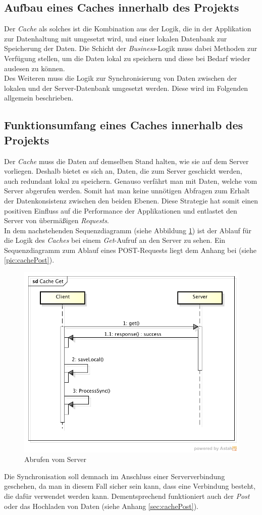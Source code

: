 \subsection{Aufbau eines Caches innerhalb des Projekts}
\label{ssec:cache-aufbau}
Der \textit{Cache} als solches ist die Kombination aus der Logik, die in der Applikation zur Datenhaltung mit umgesetzt wird, und einer lokalen Datenbank zur Speicherung der Daten. Die Schicht der \textit{Business}-Logik muss dabei Methoden zur Verfügung stellen, um die Daten lokal zu speichern und diese bei Bedarf wieder auslesen zu können.\\
Des Weiteren muss die Logik zur Synchronisierung von Daten zwischen der lokalen und der Server-Datenbank umgesetzt werden. Diese wird im Folgenden allgemein beschrieben.
\subsection{Funktionsumfang eines Caches innerhalb des Projekts}
\label{ssec:cache-unsere-funktionsweise}
Der \textit{Cache} muss die Daten auf demselben Stand halten, wie sie auf dem Server vorliegen. Deshalb bietet es sich an, Daten, die zum Server geschickt werden, auch redundant lokal zu speichern. Genauso verfährt man mit Daten, welche vom Server abgerufen werden. Somit hat man keine unnötigen Abfragen zum Erhalt der Datenkonsistenz zwischen den beiden Ebenen. Diese Strategie hat somit einen positiven Einfluss auf die Performance der Applikationen und entlastet den Server von übermäßigen \textit{Requests}. \\
In dem nachstehenden Sequenzdiagramm (siehe Abbildung \ref{pic:cacheGet}) ist der Ablauf für die Logik des \textit{Caches} bei einem \textit{Get}-Aufruf an den Server zu sehen. Ein Sequenzdiagramm zum Ablauf eines POST-Requests liegt dem Anhang bei (siehe \ref{pic:cachePost}).
\begin{figure}[!h]
\centering
\includegraphics[width=0.8\linewidth]{content/images/Cache-Get}
\caption{Abrufen vom Server}
\label{pic:cacheGet}
\end{figure}
Die Synchronisation soll demnach im Anschluss einer Serververbindung geschehen, da man in diesem Fall sicher sein kann, dass eine Verbindung besteht, die dafür verwendet werden kann. Dementsprechend funktioniert auch der \textit{Post} oder das Hochladen von Daten (siehe Anhang \ref{sec:cachePost}).